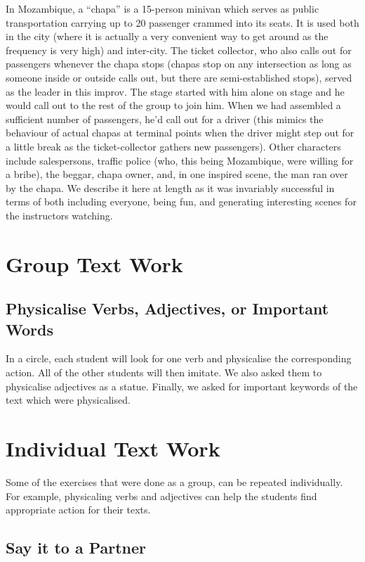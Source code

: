 \documentclass[article,twoside]{memoir}
\begin{document}
In Mozambique, a ``chapa'' is a 15-person minivan which serves as public
transportation carrying up to 20 passenger crammed into its seats. It is used
both in the city (where it is actually a very convenient way to get around as
the frequency is very high) and inter-city. The ticket collector, who also
calls out for passengers whenever the chapa stops (chapas stop on any
intersection as long as someone inside or outside calls out, but there are
semi-established stops), served as the leader in this improv. The stage started
with him alone on stage and he would call out to the rest of the group to join
him. When we had assembled a sufficient number of passengers, he'd call out for
a driver (this mimics the behaviour of actual chapas at terminal points when
the driver might step out for a little break as the ticket-collector gathers
new passengers). Other characters include salespersons, traffic police (who,
this being Mozambique, were willing for a bribe), the beggar, chapa owner, and,
in one inspired scene, the man ran over by the chapa. We describe it here at
length as it was invariably successful in terms of both including everyone,
being fun, and generating interesting scenes for the instructors watching.

\section{Group Text Work}


\subsection{Physicalise Verbs, Adjectives, or Important Words}

In a circle, each student will look for one verb and physicalise the
corresponding action. All of the other students will then imitate. We also
asked them to physicalise adjectives as a statue. Finally, we asked for
important keywords of the text which were physicalised.

\section{Individual Text Work}

Some of the exercises that were done as a group, can be repeated individually.
For example, physicaling verbs and adjectives can help the students find
appropriate action for their texts.

\subsection{Say it to a Partner}
\end{document}

